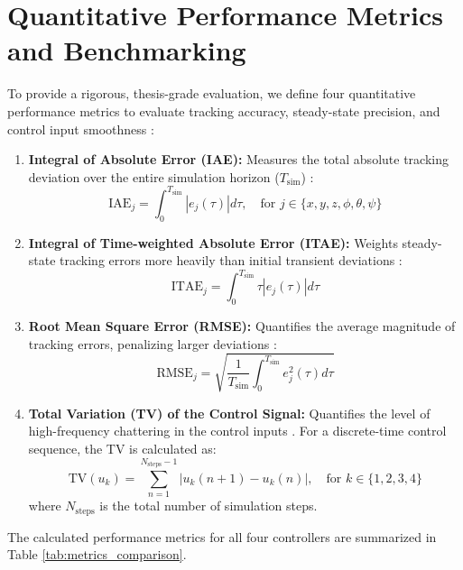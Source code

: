 \section{Quantitative Performance Metrics and Benchmarking}
To provide a rigorous, thesis-grade evaluation, we define four quantitative performance metrics to evaluate tracking accuracy, steady-state precision, and control input smoothness \cite{ref_84, ref_85}:

\begin{enumerate}
    \item \textbf{Integral of Absolute Error (IAE):} Measures the total absolute tracking deviation over the entire simulation horizon ($T_{\text{sim}}$) \cite{ref_84}:
    \begin{equation}
    \text{IAE}_j = \int_{0}^{T_{\text{sim}}} |e_j(\tau)| d\tau, \quad \text{for } j \in \{x, y, z, \phi, \theta, \psi\}
    \end{equation}
    \item \textbf{Integral of Time-weighted Absolute Error (ITAE):} Weights steady-state tracking errors more heavily than initial transient deviations \cite{ref_84}:
    \begin{equation}
    \text{ITAE}_j = \int_{0}^{T_{\text{sim}}} \tau |e_j(\tau)| d\tau
    \end{equation}
    \item \textbf{Root Mean Square Error (RMSE):} Quantifies the average magnitude of tracking errors, penalizing larger deviations \cite{ref_84}:
    \begin{equation}
    \text{RMSE}_j = \sqrt{\frac{1}{T_{\text{sim}}} \int_{0}^{T_{\text{sim}}} e_j^2(\tau) d\tau}
    \end{equation}
    \item \textbf{Total Variation (TV) of the Control Signal:} Quantifies the level of high-frequency chattering in the control inputs \cite{ref_85}. For a discrete-time control sequence, the TV is calculated as:
    \begin{equation}
    \text{TV}(u_k) = \sum_{n=1}^{N_{\text{steps}}-1} |u_k(n+1) - u_k(n)|, \quad \text{for } k \in \{1, 2, 3, 4\}
    \end{equation}
    where $N_{\text{steps}}$ is the total number of simulation steps.
\end{enumerate}

The calculated performance metrics for all four controllers are summarized in Table \ref{tab:metrics_comparison}.

